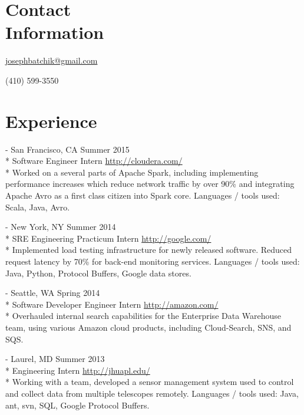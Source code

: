 \documentclass[a4paper,margin,line]{resume}
\newcommand{\rurl}[1]{\hfill {\footnotesize \url{#1}}}
\newcommand{\rdate}[1]{\hfill {\small #1}}
\renewcommand{\employer}[5]{ \item[#1] - #2 \rdate{#3} \\* #4 \rurl{#5} \\*}
\begin{document}
\begin{resume}
\section{\mysidestyle Contact \\ Information} \vspace{2mm}
	\begin{asparablank}
    \item \hfill \href{mailto:josephbatchik@gmail.com}{josephbatchik@gmail.com}
    \item \hfill (410) 599-3550
	\end{asparablank}

\section{\mysidestyle Experience}
	\begin{asparadesc}
        \employer{Cloudera}{San Francisco, CA}{Summer 2015}{Software Engineer Intern}
        {http://cloudera.com/}
        \small
        Worked on a several parts of Apache Spark, including implementing performance
        increases which reduce network traffic by over 90\% and integrating Apache
        Avro as a first class citizen into Spark core. Languages / tools used: 
        Scala, Java, Avro.
        \normalsize
        \\
        \employer{Google}{New York, NY}{Summer 2014}{SRE Engineering Practicum Intern}
        {http://google.com/}
		\small
        Implemented load testing infrastructure for newly released software.
        Reduced request latency by 70\% for back-end monitoring services.
        Languages / tools used: Java, Python, Protocol Buffers, Google data stores.
		\normalsize
		\\
		\employer{Amazon}{Seattle, WA}{Spring 2014}{Software Developer Engineer Intern}
        {http://amazon.com/}
		\small
	    Overhauled internal search capabilities for the Enterprise Data Warehouse
        team, using various Amazon cloud products, including Cloud-Search, SNS,
        and SQS.
        \normalsize
		\\
		\employer{John Hopkins University Applied Physics Lab}{Laurel, MD}
        {Summer 2013}{Engineering Intern}{http://jhuapl.edu/}
		\small
		Working with a team, developed a sensor management system used to control and collect data from
        multiple telescopes remotely. Languages / tools used: Java, ant, svn, SQL,
        Google Protocol Buffers.

\end{asparadesc}
\end{resume}
\end{document}
